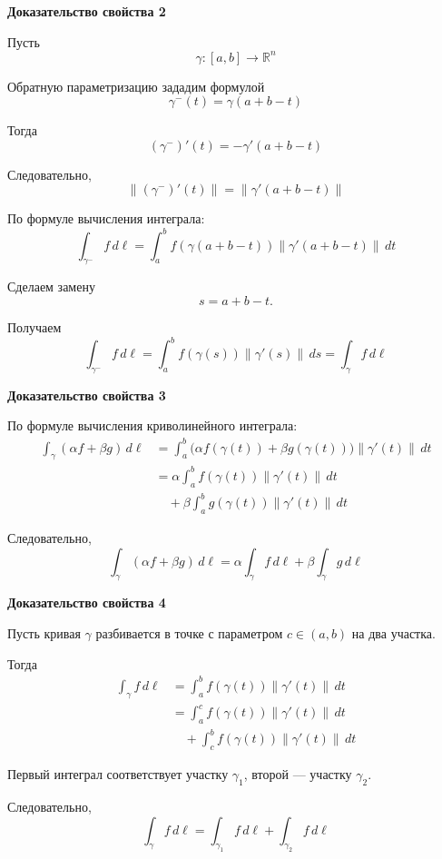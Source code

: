 \documentclass[12pt,a4paper]{article}
\begin{document}
\textbf{Доказательство свойства 2}

\begin{proofbox}
Пусть
\[
\gamma:[a,b]\to\mathbb{R}^n
\]

Обратную параметризацию зададим формулой
\[
\gamma^{-}(t)=\gamma(a+b-t)
\]

Тогда
\[
(\gamma^{-})'(t)
=
-\gamma'(a+b-t)
\]

Следовательно,
\[
\|(\gamma^{-})'(t)\|
=
\|\gamma'(a+b-t)\|
\]

По формуле вычисления интеграла:
\[
\int_{\gamma^{-}}f\,d\ell
=
\int_a^b
f(\gamma(a+b-t))
\|\gamma'(a+b-t)\|\,dt
\]

Сделаем замену
\[
s=a+b-t.
\]

Получаем
\[
\int_{\gamma^{-}}f\,d\ell
=
\int_a^b
f(\gamma(s))\|\gamma'(s)\|\,ds
=
\int_\gamma f\,d\ell
\]
\end{proofbox}

\textbf{Доказательство свойства 3}

\begin{proofbox}
По формуле вычисления криволинейного интеграла:
\[
\begin{aligned}
\int_\gamma(\alpha f+\beta g)\,d\ell
&=
\int_a^b
\bigl(\alpha f(\gamma(t))
+\beta g(\gamma(t))\bigr)
\|\gamma'(t)\|\,dt\\
&=
\alpha\int_a^b
f(\gamma(t))\|\gamma'(t)\|\,dt\\
&\quad+
\beta\int_a^b
g(\gamma(t))\|\gamma'(t)\|\,dt
\end{aligned}
\]

Следовательно,
\[
\int_\gamma(\alpha f+\beta g)\,d\ell
=
\alpha\int_\gamma f\,d\ell
+
\beta\int_\gamma g\,d\ell
\]
\end{proofbox}

\textbf{Доказательство свойства 4}

\begin{proofbox}
Пусть кривая $\gamma$ разбивается в точке с параметром $c\in(a,b)$ на два участка.

Тогда
\[
\begin{aligned}
\int_\gamma f\,d\ell
&=
\int_a^b
f(\gamma(t))\|\gamma'(t)\|\,dt\\
&=
\int_a^c
f(\gamma(t))\|\gamma'(t)\|\,dt\\
&\quad+
\int_c^b
f(\gamma(t))\|\gamma'(t)\|\,dt
\end{aligned}
\]

Первый интеграл соответствует участку $\gamma_1$, второй — участку $\gamma_2$.

Следовательно,
\[
\int_\gamma f\,d\ell
=
\int_{\gamma_1}f\,d\ell
+
\int_{\gamma_2}f\,d\ell
\]
\end{proofbox}
\end{document}
